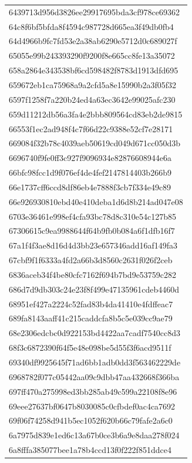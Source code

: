 \begin{tabular}{l}
6439713d956d3826ee29917695bda3cf978ce69362 \\
64c8f6bf5bfda8f4594c987728d665ea3f49db0fb4 \\
64d4966b9fc7fd53e2a38ab6290e5712d0c689027f \\
65055e99b243393290f9200f8e665cc8fe13a35072 \\
658a2864e343538bf6cd598482f8783d1913dfd695 \\
659672eb1ca75968a9a2cfd5a8e15990b2a3f05f32 \\
6597f1258f7a220b24ed4a63ec3642e99025afc230 \\
659d11212db56a3fa4e2bbb809564cd83eb2de9815 \\
66553f1ec2ad948f4c7f66d22c9388e52cf7e28171 \\
669084f32b78c4039aeb50619cd049d671cc050d3b \\
6696740f9fe0ff3c927f9096934e82876608944e6a \\
66bfc98fcc1d9f076ef4de4fef2147814403b266b9 \\
66e1737cff6ccd8df86eb4e7888f3cb7f334e49c89 \\
66e926930810ebd40e410deba1d6d8b214ad047e08 \\
6703e36461e998ef4cfa93bc78d8c310e54c127b85 \\
67306615c9ea9988644f64b9fb0b084a6f1dfb16f7 \\
67a1f4f3ae8d16d4d3bb23e657346add16af149fa3 \\
67cbf9f1f6333a4fd2a66b3d8560c2631f026f2ceb \\
6836aceb34f4be80cfc7162f694b7bd9e53759c282 \\
686d7d9db303c24e23f8f499e47135961cdeb4460d \\
68951ef427a2224c52fad83b4da41410e4fdffeac7 \\
689fa8143aaff41c215caddcfa8b5c5e039cc9ae79 \\
68e2306edcbc0d922153bd4422aa7cadf7540cc8d3 \\
68f3c6872390f64f5e48e098be5d55f3f6acd9511f \\
69340df9925645f71ad6bb1adb0dd3f563462229de \\
6968782f077c05442aa09c9dbb47aa432668f366ba \\
697ff470a275998ed3bb285ab49c599a22108f8e96 \\
69eee27637bf0647b8030085c0cfbdef0ac4ca7692 \\
69f06f74258d941b5ec1052f620b66c79fafe2a6c0 \\
6a7975d839e1ed6c13a67b0ce3b6a9e8daa278f024 \\
6a8fffa385077bee1a78b4ccd13f0f222f851ddce4 \\

\end{tabular}
